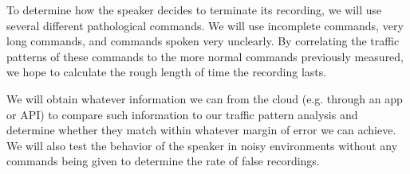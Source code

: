 To determine how the speaker decides to terminate its recording, we will use several different pathological commands. We will use incomplete commands, very long commands, and commands spoken very unclearly. By correlating the traffic patterns of these commands to the more normal commands previously measured, we hope to calculate the rough length of time the recording lasts.

We will obtain whatever information we can from the cloud (e.g. through an app or API) to compare such information to our traffic pattern analysis and determine whether they match within whatever margin of error we can achieve. We will also test the behavior of the speaker in noisy environments without any commands being given to determine the rate of false recordings.
